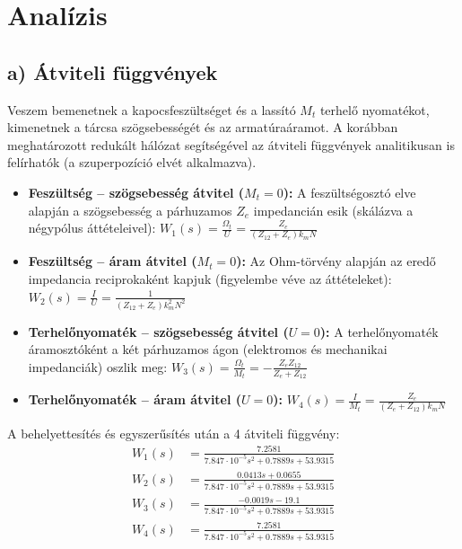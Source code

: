 
\newpage
\section{Analízis}
\subsection{a) Átviteli függvények}
Veszem bemenetnek a kapocsfeszültséget és a lassító $M_t$ terhelő nyomatékot, kimenetnek a tárcsa szögsebességét és az armatúraáramot. A korábban meghatározott redukált hálózat segítségével az átviteli függvények analitikusan is felírhatók (a szuperpozíció elvét alkalmazva).
\begin{itemize}
    \item \textbf{Feszültség -- szögsebesség átvitel ($M_t = 0$):} A feszültségosztó elve alapján a szögsebesség a párhuzamos $Z_e$ impedancián esik (skálázva a négypólus áttételeivel): $W_1(s) = \frac{\Omega_t}{U} = \frac{Z_e}{(Z_{12} + Z_e) k_m N}$
    \item \textbf{Feszültség -- áram átvitel ($M_t = 0$):} Az Ohm-törvény alapján az eredő impedancia reciprokaként kapjuk (figyelembe véve az áttételeket): $W_2(s) = \frac{I}{U} = \frac{1}{(Z_{12} + Z_e) k_m^2 N^2}$
    \item \textbf{Terhelőnyomaték -- szögsebesség átvitel ($U = 0$):} A terhelőnyomaték áramosztóként a két párhuzamos ágon (elektromos és mechanikai impedanciák) oszlik meg: $W_3(s) = \frac{\Omega_t}{M_t} = -\frac{Z_e Z_{12}}{Z_e + Z_{12}}$
    \item \textbf{Terhelőnyomaték -- áram átvitel ($U = 0$):} $W_4(s) = \frac{I}{M_t} = \frac{Z_e}{(Z_e + Z_{12}) k_m N}$
\end{itemize}

A behelyettesítés és egyszerűsítés után a 4 átviteli függvény:
\begin{align}
    W_1(s) & = \frac{7.2581}{7.847 \cdot 10^{-5} s^{2} + 0.7889 s + 53.9315}              \\
    W_2(s) & = \frac{0.0413 s + 0.0655}{7.847 \cdot 10^{-5} s^{2} + 0.7889 s + 53.9315}          \\
    W_3(s) & = \frac{- 0.0019 s - 19.1}{7.847 \cdot 10^{-5} s^{2} + 0.7889 s + 53.9315} \\
    W_4(s) & = \frac{7.2581}{7.847 \cdot 10^{-5} s^{2} + 0.7889 s + 53.9315}
\end{align}

